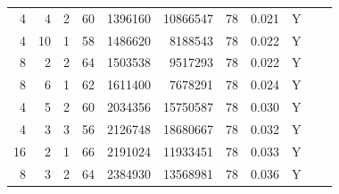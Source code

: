 \begin{table}[t]
\begin{tabularx}{\linewidth}{rrrrrrrrrrr}
4 & 4 & 2 & 60 & 1396160 & 10866547 & 78 & 0.021 & Y \\
4 & 10 & 1 & 58 & 1486620 & 8188543 & 78 & 0.022 & Y \\
8 & 2 & 2 & 64 & 1503538 & 9517293 & 78 & 0.022 & Y \\
8 & 6 & 1 & 62 & 1611400 & 7678291 & 78 & 0.024 & Y \\
4 & 5 & 2 & 60 & 2034356 & 15750587 & 78 & 0.030 & Y \\
4 & 3 & 3 & 56 & 2126748 & 18680667 & 78 & 0.032 & Y \\
16 & 2 & 1 & 66 & 2191024 & 11933451 & 78 & 0.033 & Y \\
8 & 3 & 2 & 64 & 2384930 & 13568981 & 78 & 0.036 & Y \\
\bottomrule
\end{tabularx}
\end{table}
